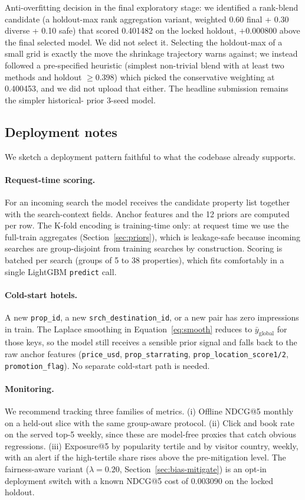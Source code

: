 \documentclass[runningheads]{llncs}
\begin{document}
Anti-overfitting decision in the final exploratory stage: we
identified a rank-blend candidate (a holdout-max rank aggregation
variant, weighted 0.60 final + 0.30 diverse + 0.10 safe) that scored
0.401482 on the locked holdout, $+0.000800$ above the final selected
model. We did not select it. Selecting the holdout-max of a small
grid is exactly the move the shrinkage trajectory warns against; we
instead followed a pre-specified heuristic (simplest non-trivial
blend with at least two methods and holdout $\geq 0.398$) which
picked the conservative weighting at 0.400453, and we did not upload
that either. The headline submission remains the simpler historical-
prior 3-seed model.

\subsection{Deployment notes}
\label{sec:deploy}

We sketch a deployment pattern faithful to what the codebase
already supports.

\paragraph{Request-time scoring.}
For an incoming search the model receives the candidate property
list together with the search-context fields. Anchor features and
the 12 priors are computed per row. The K-fold encoding is
training-time only: at request time we use the full-train
aggregates (Section~\ref{sec:priors}), which is leakage-safe because
incoming searches are group-disjoint from training searches by
construction. Scoring is batched per search (groups of 5 to 38
properties), which fits comfortably in a single LightGBM
\texttt{predict} call.

\paragraph{Cold-start hotels.}
A new \texttt{prop\_id}, a new \texttt{srch\_destination\_id}, or
a new pair has zero impressions in train. The Laplace smoothing
in Equation~\ref{eq:smooth} reduces to $\bar{y}_{\text{global}}$ for those
keys, so the model still receives a sensible prior signal and
falls back to the raw anchor features (\texttt{price\_usd},
\texttt{prop\_starrating}, \texttt{prop\_location\_score1/2},
\texttt{promotion\_flag}). No separate cold-start path is needed.

\paragraph{Monitoring.}
We recommend tracking three families of metrics. (i) Offline
NDCG@5 monthly on a held-out slice with the same group-aware
protocol. (ii) Click and book rate on the served top-5 weekly,
since these are model-free proxies that catch obvious regressions.
(iii) Exposure@5 by popularity tertile and by visitor country,
weekly, with an alert if the high-tertile share rises above the
pre-mitigation level. The fairness-aware variant
($\lambda = 0.20$, Section~\ref{sec:bias-mitigate}) is an opt-in
deployment switch with a known NDCG@5 cost of 0.003090 on the
locked holdout.
\end{document}
